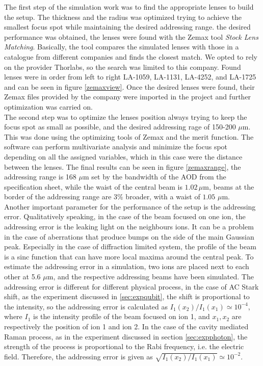 The first step of the simulation work was to find the appropriate lenses to build the setup. The thickness and the radius was optimized trying to achieve the smallest focus spot while maintaining the desired addressing range. the desired performance was obtained, the lenses were found with the Zemax tool \emph{Stock Lens Matching}. Basically, the tool compares the simulated lenses with those in a catalogue from different companies and finds the closest match. We opted to rely on the provider Thorlabs, so the search was limited to this company. Found lenses were in order from left to right LA-1059, LA-1131, LA-4252, and LA-1725 and can be seen in figure \ref{zemaxview}. Once the desired lenses were found, their Zemax files provided by the company were imported in the project and further optimization was carried on.\\
The second step was to optimize the lenses position always trying to keep the focus spot as small as possible, and the desired addressing rage of 150-200 $\mu$m. This was done using the optimizing tools of Zemax and the merit function. The software can perform multivariate analysis and minimize the focus spot depending on all the assigned variables, which in this case were the distance between the lenses. The final results can be seen in figure \ref{zemaxrange}, the addressing range is 168 $\mu$m set by the bandwidth of the AOD from the specification sheet, while the waist of the central beam is $1.02\,\mu$m, beams at the border of the addressing range are $3\%$ broader, with a waist of $1.05$ $\mu$m.\\
Another important parameter for the performance of the setup is the addressing error. Qualitatively speaking, in the case of the beam focused on one ion, the addressing error is the leaking light on the neighbours ions. It can be a problem in the case of aberrations that produce bumps on the side of the main Gaussian peak. Especially in the case of diffraction limited system, the profile of the beam is a sinc function that can have more local maxima around the central peak. To estimate the addressing error in a simulation, two ions are placed next to each other at 5.6 $\mu$m, and the respective addressing beams have been simulated. The addressing error is different for different physical process, in the case of AC Stark shift, as the experiment discussed in \ref{sec:expqubit}, the shift is proportional to the intensity, so the addressing error is calculated as $I_1(x_2)/I_1(x_1) \simeq 10^{-4}$, where $I_{1}$ is the intensity profile of the beam focused on ion 1, and $x_1,x_2$ are respectively the position of ion 1 and ion 2. In the case of the cavity mediated Raman process, as in the experiment discussed in section \ref{sec:expphoton}, the strength of the process is proportional to the Rabi frequency, i.e. the electric field. Therefore, the addressing error is given as $\sqrt{I_1(x_2)/I_1(x_1)} \simeq 10^{-2}$.
